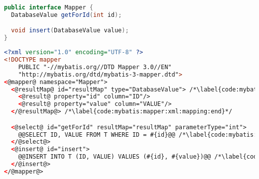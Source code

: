 
\begin{lstlisting}[language=Java, belowskip=-2mm]
public interface Mapper {
  DatabaseValue getForId(int id);

  void insert(DatabaseValue value);
}
\end{lstlisting}

\begin{lstlisting}[language=XML, caption={Definition of XML Mapper interface}, label={code:mybatis:interface:xml}]
<?xml version="1.0" encoding="UTF-8" ?>
<!DOCTYPE mapper
    PUBLIC "-//mybatis.org//DTD Mapper 3.0//EN"
    "http://mybatis.org/dtd/mybatis-3-mapper.dtd">
<@mapper@ namespace="Mapper">
  <@resultMap@ id="resultMap" type="DatabaseValue"> /*\label{code:mybatis:mapper:xml:mapping:begin}*/
    <@result@ property="id" column="ID"/>
    <@result@ property="value" column="VALUE"/>
  </@resultMap@> /*\label{code:mybatis:mapper:xml:mapping:end}*/

  <@select@ id="getForId" resultMap="resultMap" parameterType="int">
    @@SELECT ID, VALUE FROM T WHERE ID = #{id}@@ /*\label{code:mybatis:mapper:xml:query}*/
  </@select@>
  <@insert@ id="insert">
    @@INSERT INTO T (ID, VALUE) VALUES (#{id}, #{value})@@ /*\label{code:mybatis:mapper:xml:insert}*/
  </@insert@>
</@mapper@>
\end{lstlisting}
